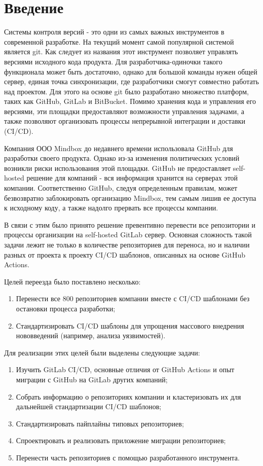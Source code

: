 \chapter*{Введение}

Системы контроля версий - это одни из самых важных инструментов в современной разработке.
На текущий момент самой популярной системой является git.
Как следует из названия этот инструмент позволяет управлять версиями исходного кода продукта.
Для разработчика-одиночки такого функционала может быть достаточно, однако для большой команды нужен общей сервер,
единая точка синхронизации, где разработчики смогут совместно работать над проектом.
Для этого на основе git было разработано множество платформ, таких как GitHub, GitLab и BitBucket.
Помимо хранения кода и управления его версиями, эти площадки предоставляют возможности управления задачами,
а также позволяют организовать процессы непрерывной интеграции и доставки (CI/CD).

Компания ООО Mindbox до недавнего времени использовала GitHub для разработки своего продукта.
Однако из-за изменения политических условий возникли риски использования этой площадки.
GitHub не предоставляет self-hosted решение для компаний - вся информация хранится на серверах этой компании.
Соответственно GitHub, следуя определенным правилам, может безвозвратно заблокировать организацию Mindbox,
тем самым лишив ее доступа к исходному коду, а также надолго прервать все процессы компании.

В связи с этим было принято решение превентивно перевести все репозитории и процессы организации на self-hosted GitLab сервер.
Основная сложность такой задачи лежит не только в количестве репозиториев для переноса,
но и наличии разных от проекта к проекту CI/CD шаблонов, описанных на основе GitHub Actions.

Целей переезда было поставлено несколько:
\begin{enumerate}
  \item Перенести все 800 репозиториев компании вместе с CI/CD шаблонами без остановки процесса разработки;
  \item Стандартизировать CI/CD шаблоны для упрощения массового внедрения нововведений (например, анализа уязвимостей).
\end{enumerate}

Для реализации этих целей были выделены следующие задачи:
\begin{enumerate}
  \item Изучить GitLab CI/CD, основные отличия от GitHub Actions и опыт миграции с GitHub на GitLab других компаний;
  \item Собрать информацию о репозиториях компании и кластеризовать их для дальнейшей стандартизации CI/CD шаблонов;
  \item Стандартизировать пайплайны типовых репозиториев;
  \item Спроектировать и реализовать приложение миграции репозиториев;
  \item Перенести часть репозиториев с помощью разработанного инструмента.
\end{enumerate}
